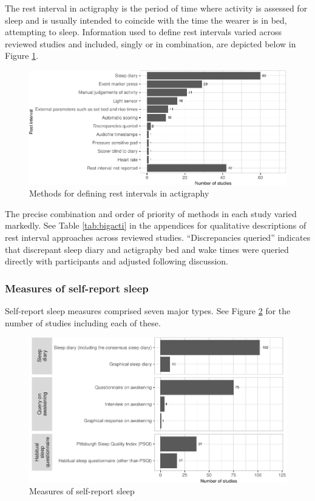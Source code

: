 \documentclass[
]{article}
\begin{document}
The rest interval in actigraphy is the period of time where activity is assessed for sleep and is usually intended to coincide with the time the wearer is in bed, attempting to sleep. Information used to define rest intervals varied across reviewed studies and included, singly or in combination, are depicted below in Figure \ref{fig:intervals}.

\begin{figure}
\centering
\includegraphics{review_markdown_files/figure-latex/intervals-1.pdf}
\caption{\label{fig:intervals}Methods for defining rest intervals in actigraphy}
\end{figure}

The precise combination and order of priority of methods in each study varied markedly. See Table \ref{tab:bigacti} in the appendices for qualitative descriptions of rest interval approaches across reviewed studies. ``Discrepancies queried'' indicates that discrepant sleep diary and actigraphy bed and wake times were queried directly with participants and adjusted following discussion.

\subsubsection{Measures of self-report sleep}\label{measures-of-self-report-sleep}

Self-report sleep measures comprised seven major types. See Figure \ref{fig:srmeasure} for the number of studies including each of these.

\begin{figure}
\centering
\includegraphics{review_markdown_files/figure-latex/srmeasure-1.pdf}
\caption{\label{fig:srmeasure}Measures of self-report sleep}
\end{figure}
\end{document}
